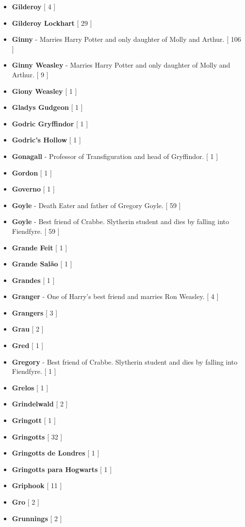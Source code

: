 \documentclass[a4paper]{article}
\begin{document}
\begin{itemize}
	\item \textbf{Gilderoy} [ 4 ]
	\item \textbf{Gilderoy Lockhart} [ 29 ]
	\item \textbf{Ginny} - Marries Harry Potter and only daughter of Molly and Arthur. [ 106 ]
	\item \textbf{Ginny Weasley} - Marries Harry Potter and only daughter of Molly and Arthur. [ 9 ]
	\item \textbf{Giony Weasley} [ 1 ]
	\item \textbf{Gladys Gudgeon} [ 1 ]
	\item \textbf{Godric Gryffindor} [ 1 ]
	\item \textbf{Godric's Hollow} [ 1 ]
	\item \textbf{Gonagall} - Professor of Transfiguration and head of Gryffindor. [ 1 ]
	\item \textbf{Gordon} [ 1 ]
	\item \textbf{Governo} [ 1 ]
	\item \textbf{Goyle} - Death Eater and father of Gregory Goyle. [ 59 ]
	\item \textbf{Goyle} - Best friend of Crabbe. Slytherin student and dies by falling into Fiendfyre. [ 59 ]
	\item \textbf{Grande Feit} [ 1 ]
	\item \textbf{Grande Salão} [ 1 ]
	\item \textbf{Grandes} [ 1 ]
	\item \textbf{Granger} - One of Harry's best friend and marries Ron Weasley. [ 4 ]
	\item \textbf{Grangers} [ 3 ]
	\item \textbf{Grau} [ 2 ]
	\item \textbf{Gred} [ 1 ]
	\item \textbf{Gregory} - Best friend of Crabbe. Slytherin student and dies by falling into Fiendfyre. [ 1 ]
	\item \textbf{Grelos} [ 1 ]
	\item \textbf{Grindelwald} [ 2 ]
	\item \textbf{Gringott} [ 1 ]
	\item \textbf{Gringotts} [ 32 ]
	\item \textbf{Gringotts de Londres} [ 1 ]
	\item \textbf{Gringotts para Hogwarts} [ 1 ]
	\item \textbf{Griphook} [ 11 ]
	\item \textbf{Gro} [ 2 ]
	\item \textbf{Grunnings} [ 2 ]

\end{itemize}
\end{document}
